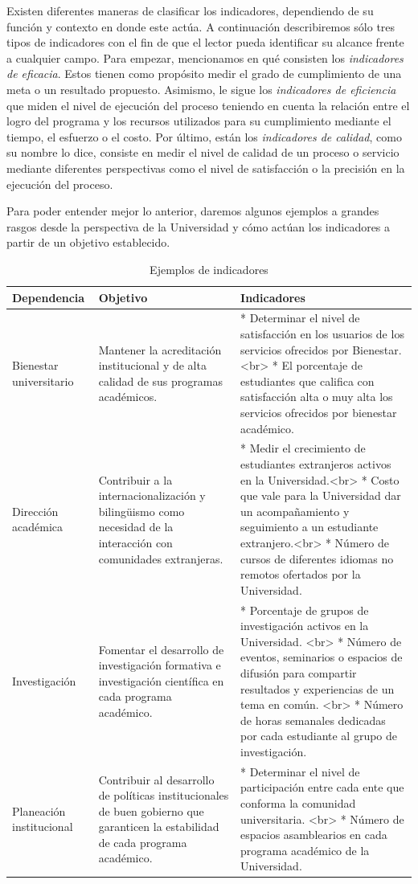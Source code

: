\documentclass[
  11pt,
]{book}
\begin{document}
Existen diferentes maneras de clasificar los indicadores, dependiendo de su función y contexto en donde este actúa. A continuación describiremos sólo tres tipos de indicadores con el fin de que el lector pueda identificar su alcance frente a cualquier campo. Para empezar, mencionamos en qué consisten los \emph{indicadores de eficacia}. Estos tienen como propósito medir el grado de cumplimiento de una meta o un resultado propuesto. Asimismo, le sigue los \emph{indicadores de eficiencia} que miden el nivel de ejecución del proceso teniendo en cuenta la relación entre el logro del programa y los recursos utilizados para su cumplimiento mediante el tiempo, el esfuerzo o el costo. Por último, están los \emph{indicadores de calidad}, como su nombre lo dice, consiste en medir el nivel de calidad de un proceso o servicio mediante diferentes perspectivas como el nivel de satisfacción o la precisión en la ejecución del proceso.

Para poder entender mejor lo anterior, daremos algunos ejemplos a grandes rasgos desde la perspectiva de la Universidad y cómo actúan los indicadores a partir de un objetivo establecido.

\begin{table}

\caption{\label{tab:unnamed-chunk-2}Ejemplos de indicadores}
\centering
\begin{tabular}[t]{l|l|l}
\hline
Dependencia & Objetivo & Indicadores\\
\hline
Bienestar universitario & Mantener la acreditación institucional y de alta calidad de sus programas académicos. & * Determinar el nivel de satisfacción en los usuarios de los servicios ofrecidos por Bienestar. <br> * El porcentaje  de estudiantes que califica con satisfacción alta o muy alta los servicios ofrecidos por bienestar académico.\\
\hline
Dirección académica & Contribuir a la internacionalización y bilingüismo como necesidad de la interacción con comunidades extranjeras. & * Medir el crecimiento de estudiantes extranjeros activos en la Universidad.<br> * Costo que vale para la Universidad dar un acompañamiento y seguimiento a un estudiante extranjero.<br> * Número de cursos de diferentes  idiomas no remotos ofertados por la Universidad.\\
\hline
Investigación & Fomentar el desarrollo de investigación formativa e investigación científica en cada programa académico. & * Porcentaje de grupos de investigación activos en la Universidad. <br> * Número de eventos, seminarios o espacios de difusión para compartir resultados y experiencias de un tema en común. <br> * Número de horas semanales dedicadas por cada estudiante al grupo de investigación.\\
\hline
Planeación institucional & Contribuir al desarrollo de políticas institucionales de buen gobierno que garanticen la estabilidad de cada programa académico. & * Determinar el nivel de participación entre cada ente que conforma la comunidad universitaria. <br> * Número de espacios asamblearios en cada programa académico de la Universidad.\\
\hline
\end{tabular}
\end{table}
\end{document}
